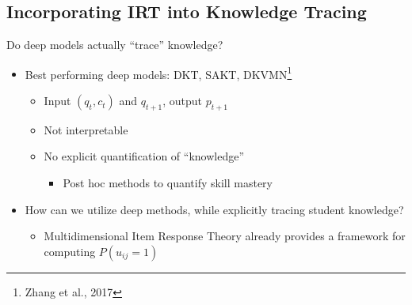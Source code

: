 \documentclass{beamer}
\theoremstyle{definition}
\begin{document}

\subsection{Incorporating IRT into Knowledge Tracing}

\begin{frame}{Do deep models actually ``trace'' knowledge?}
  \begin{itemize}
    \item Best performing deep models: DKT, SAKT, DKVMN\footnote{Zhang et al., 2017}
      \begin{itemize}
        \item Input $(q_t, c_t)$ and $q_{t+1}$, output $p_{t+1}$
        \item<2-> Not interpretable
        \item<2-> No explicit quantification of ``knowledge''
          \begin{itemize}
            \item Post hoc methods to quantify skill mastery
          \end{itemize}
      \end{itemize}
    \item<3-> How can we utilize deep methods, while explicitly tracing student knowledge?
      \begin{itemize}
        \item<4-> Multidimensional Item Response Theory already provides a framework for computing $P(u_{ij} = 1)$
      \end{itemize}
  \end{itemize}
\end{frame}
\end{document}
